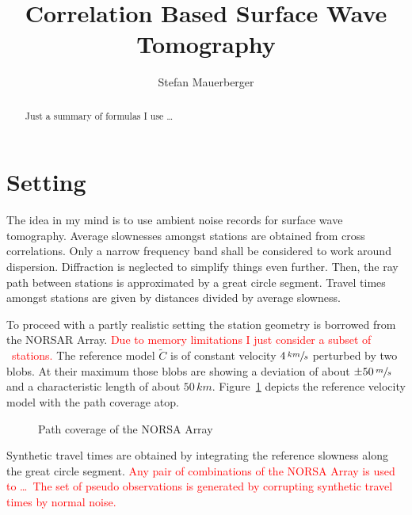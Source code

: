 \documentclass[11pt]{article}
\title{Correlation Based Surface Wave Tomography}
\author{Stefan Mauerberger}
\newcommand\worries[1]{\textcolor{red}{#1}}
\begin{document}
\maketitle
\begin{abstract}
    Just a summary of formulas I use \dots
\end{abstract}

\section{Setting}


The idea in my mind is to use ambient noise records for surface wave tomography.
Average slownesses amongst stations are obtained from cross correlations.
Only a narrow frequency band shall be considered to work around dispersion.
Diffraction is neglected to simplify things even further.
Then, the ray path between stations is approximated by a great circle segment.
Travel times amongst stations are given by distances divided by average slowness.

To proceed with a partly realistic setting the station geometry is borrowed from the NORSAR Array.
\worries{Due to memory limitations I just consider a subset of \SFWnobs\ stations.}
The reference model $\tilde C$ is of constant velocity $4\,\sfrac{km}s$ perturbed by two blobs.
At their maximum those blobs are showing a deviation of about $\pm 50\,\sfrac ms$ and a characteristic length of about $50\,km$.
Figure~\ref{fig:path_coverage} depicts the reference velocity model with the path coverage atop.

\begin{figure}
    \centering
    
    \caption{Path coverage of the NORSA Array}
    \label{fig:path_coverage}
\end{figure}

Synthetic travel times are obtained by integrating the reference slowness along the great circle segment.
\worries{Any pair of combinations of the NORSA Array is used to \dots\
The set of pseudo observations is generated by corrupting synthetic travel times by normal noise.}
\end{document}
